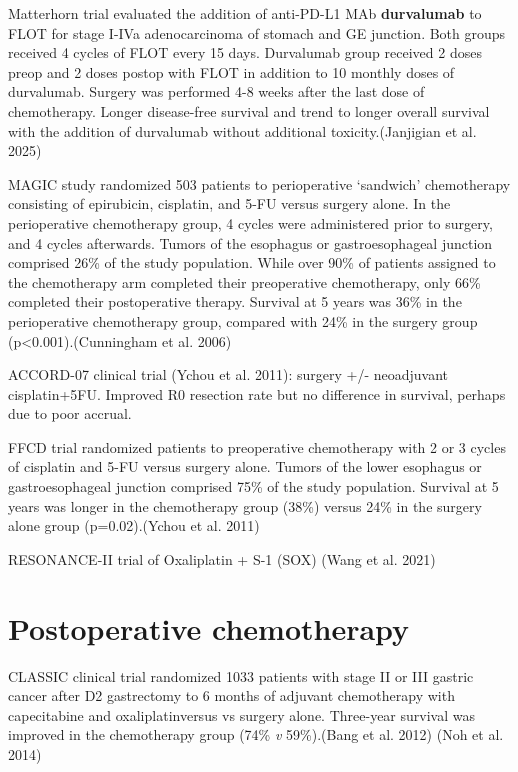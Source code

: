 \documentclass[
  letterpaper,
]{scrbook}
\begin{document}
Matterhorn trial evaluated the addition of anti-PD-L1 MAb
\textbf{durvalumab} to FLOT for stage I-IVa adenocarcinoma of stomach
and GE junction. Both groups received 4 cycles of FLOT every 15 days.
Durvalumab group received 2 doses preop and 2 doses postop with FLOT in
addition to 10 monthly doses of durvalumab. Surgery was performed 4-8
weeks after the last dose of chemotherapy. Longer disease-free survival
and trend to longer overall survival with the addition of durvalumab
without additional toxicity.(Janjigian et al. 2025)

MAGIC study randomized 503 patients to perioperative `sandwich'
chemotherapy consisting of epirubicin, cisplatin, and 5-FU versus
surgery alone. In the perioperative chemotherapy group, 4 cycles were
administered prior to surgery, and 4 cycles afterwards. Tumors of the
esophagus or gastroesophageal junction comprised 26\% of the study
population. While over 90\% of patients assigned to the chemotherapy arm
completed their preoperative chemotherapy, only 66\% completed their
postoperative therapy. Survival at 5 years was 36\% in the perioperative
chemotherapy group, compared with 24\% in the surgery group
(p\textless0.001).(Cunningham et al. 2006)

ACCORD-07 clinical trial (Ychou et al. 2011): surgery +/- neoadjuvant
cisplatin+5FU. Improved R0 resection rate but no difference in survival,
perhaps due to poor accrual.

FFCD trial randomized patients to preoperative chemotherapy with 2 or 3
cycles of cisplatin and 5-FU versus surgery alone. Tumors of the lower
esophagus or gastroesophageal junction comprised 75\% of the study
population. Survival at 5 years was longer in the chemotherapy group
(38\%) versus 24\% in the surgery alone group (p=0.02).(Ychou et al.
2011)

RESONANCE-II trial of Oxaliplatin + S-1 (SOX) (Wang et al. 2021)

\section{Postoperative chemotherapy}\label{postoperative-chemotherapy}

CLASSIC clinical trial randomized 1033 patients with stage II or III
gastric cancer after D2 gastrectomy to 6 months of adjuvant chemotherapy
with capecitabine and oxaliplatinversus vs surgery alone. Three-year
survival was improved in the chemotherapy group (74\% \emph{v}
59\%).(Bang et al. 2012) (Noh et al. 2014)
\end{document}
